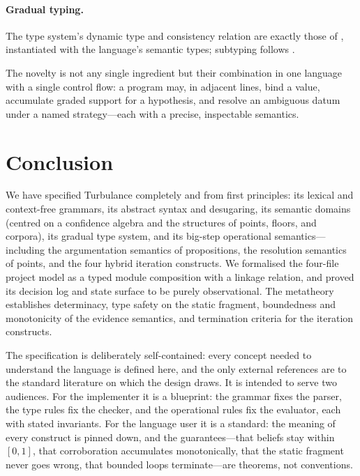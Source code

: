\documentclass[11pt,a4paper]{article}
\theoremstyle{plain}
\theoremstyle{definition}
\theoremstyle{remark}
\begin{document}
\paragraph{Gradual typing.} The type system's dynamic type and consistency
relation are exactly those of \citet{siek2006}, instantiated with the language's
semantic types; subtyping follows \citet{cardelli1985}.

The novelty is not any single ingredient but their combination in one language
with a single control flow: a program may, in adjacent lines, bind a value,
accumulate graded support for a hypothesis, and resolve an ambiguous datum under
a named strategy---each with a precise, inspectable semantics.

\section{Conclusion}
\label{sec:conclusion}

We have specified Turbulance completely and from first principles: its lexical
and context-free grammars, its abstract syntax and desugaring, its semantic
domains (centred on a confidence algebra and the structures of points, floors,
and corpora), its gradual type system, and its big-step operational
semantics---including the argumentation semantics of propositions, the
resolution semantics of points, and the four hybrid iteration constructs. We
formalised the four-file project model as a typed module composition with a
linkage relation, and proved its decision log and state surface to be purely
observational. The metatheory establishes determinacy, type safety on the
static fragment, boundedness and monotonicity of the evidence semantics, and
termination criteria for the iteration constructs.

The specification is deliberately self-contained: every concept needed to
understand the language is defined here, and the only external references are to
the standard literature on which the design draws. It is intended to serve two
audiences. For the implementer it is a blueprint: the grammar fixes the parser,
the type rules fix the checker, and the operational rules fix the evaluator,
each with stated invariants. For the language user it is a standard: the meaning
of every construct is pinned down, and the guarantees---that beliefs stay within
$[0,1]$, that corroboration accumulates monotonically, that the static fragment
never goes wrong, that bounded loops terminate---are theorems, not conventions.
\end{document}
